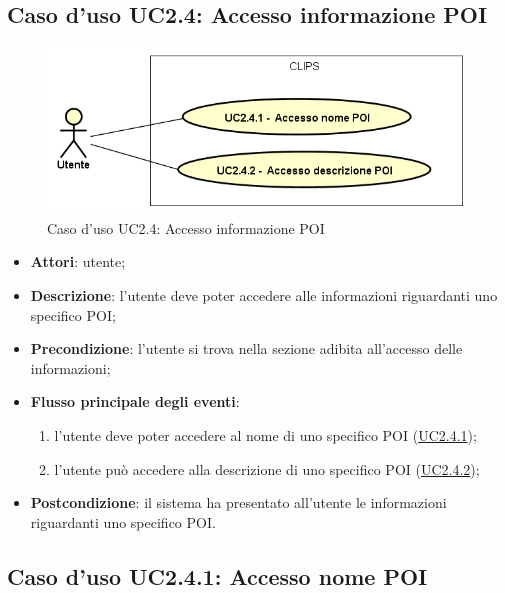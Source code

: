 \documentclass[../AnalisiDeiRequisiti.tex]{subfiles}
\begin{document}
\subsection{Caso d'uso UC2.4: Accesso informazione POI}

        \begin{figure}[!h]
            \centering
            \includegraphics[scale=0.95, width=\textwidth]{img/UC2-4.png}
            \caption{Caso d'uso UC2.4: Accesso informazione POI}\label{fig:UC2.4} 
        \end{figure}
\begin{itemize}
\item \textbf{Attori}: utente;
\item \textbf{Descrizione}: l'utente deve poter accedere alle informazioni riguardanti uno specifico POI; 
      \item \textbf{Precondizione}: l'utente si trova nella sezione adibita all'accesso delle informazioni;

        \item \textbf{Flusso principale degli eventi}:
          \begin{enumerate}
          \item l'utente deve poter accedere al nome di uno specifico POI (\hyperlink{UC2.4.1}{UC2.4.1});
          \item l'utente può accedere alla descrizione di uno specifico POI (\hyperlink{UC2.4.2}{UC2.4.2});

      \end{enumerate}
    \item \textbf{Postcondizione}: il sistema ha presentato all'utente le informazioni riguardanti uno specifico POI.
  \end{itemize}
\hypertarget{UC2.4.1}{}
\subsection{Caso d'uso UC2.4.1: Accesso nome POI}
\end{document}
